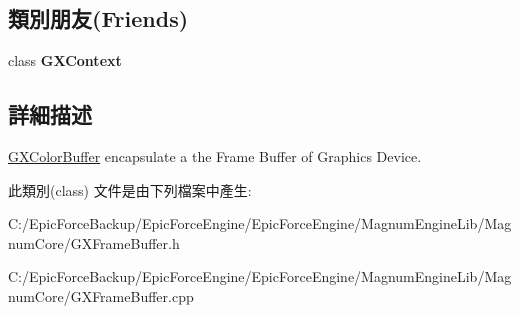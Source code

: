 \subsection*{類別朋友(Friends)}
\begin{DoxyCompactItemize}
\item 
class {\bfseries G\+X\+Context}\hypertarget{class_magnum_1_1_g_x_frame_buffer_a2c36d7f8865080802bbad88cd73d871c}{}\label{class_magnum_1_1_g_x_frame_buffer_a2c36d7f8865080802bbad88cd73d871c}

\end{DoxyCompactItemize}


\subsection{詳細描述}
\hyperlink{class_magnum_1_1_g_x_color_buffer}{G\+X\+Color\+Buffer} encapsulate a the Frame Buffer of Graphics Device. 

此類別(class) 文件是由下列檔案中產生\+:\begin{DoxyCompactItemize}
\item 
C\+:/\+Epic\+Force\+Backup/\+Epic\+Force\+Engine/\+Epic\+Force\+Engine/\+Magnum\+Engine\+Lib/\+Magnum\+Core/G\+X\+Frame\+Buffer.\+h\item 
C\+:/\+Epic\+Force\+Backup/\+Epic\+Force\+Engine/\+Epic\+Force\+Engine/\+Magnum\+Engine\+Lib/\+Magnum\+Core/G\+X\+Frame\+Buffer.\+cpp\end{DoxyCompactItemize}
